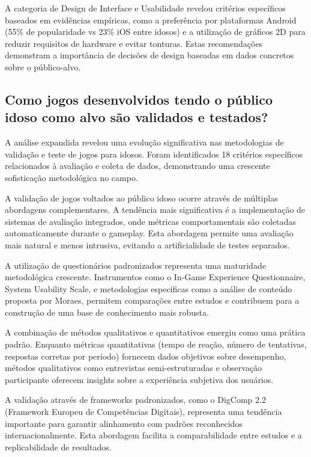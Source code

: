 \begin{table}[H]
A categoria de Design de Interface e Usabilidade revelou critérios específicos baseados em evidências empíricas, como a preferência por plataformas Android (55\% de popularidade vs 23\% iOS entre idosos) e a utilização de gráficos 2D para reduzir requisitos de hardware e evitar tonturas. Estas recomendações demonstram a importância de decisões de design baseadas em dados concretos sobre o público-alvo.

\subsection{Como jogos desenvolvidos tendo o público idoso como alvo são validados e testados?}
\label{subsec:qp2_expandida}

A análise expandida revelou uma evolução significativa nas metodologias de validação e teste de jogos para idosos. Foram identificados 18 critérios específicos relacionados à avaliação e coleta de dados, demonstrando uma crescente sofisticação metodológica no campo.

A validação de jogos voltados ao público idoso ocorre através de múltiplas abordagens complementares. A tendência mais significativa é a implementação de sistemas de avaliação integrados, onde métricas comportamentais são coletadas automaticamente durante o gameplay. Esta abordagem permite uma avaliação mais natural e menos intrusiva, evitando a artificialidade de testes separados.

A utilização de questionários padronizados representa uma maturidade metodológica crescente. Instrumentos como o In-Game Experience Questionnaire, System Usability Scale, e metodologias específicas como a análise de conteúdo proposta por Moraes, permitem comparações entre estudos e contribuem para a construção de uma base de conhecimento mais robusta.

A combinação de métodos qualitativos e quantitativos emergiu como uma prática padrão. Enquanto métricas quantitativas (tempo de reação, número de tentativas, respostas corretas por período) fornecem dados objetivos sobre desempenho, métodos qualitativos como entrevistas semi-estruturadas e observação participante oferecem insights sobre a experiência subjetiva dos usuários.

A validação através de frameworks padronizados, como o DigComp 2.2 (Framework Europeu de Competências Digitais), representa uma tendência importante para garantir alinhamento com padrões reconhecidos internacionalmente. Esta abordagem facilita a comparabilidade entre estudos e a replicabilidade de resultados.


\end{table}
